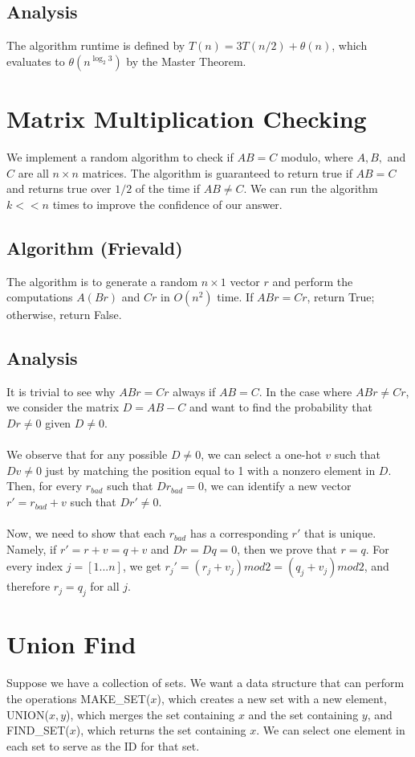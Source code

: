 \documentclass{article}
\begin{document}
\subsection*{Analysis}
The algorithm runtime is defined by $T(n) = 3 T(n/2) + \theta (n)$, which evaluates to $\theta(n^{\log_2 3})$ by the Master Theorem.
\section*{Matrix Multiplication Checking}
We implement a random algorithm to check if $AB = C$ modulo, where $A, B,$ and $C$ are all $n \times n$ matrices. The algorithm is guaranteed to return true if $AB = C$ and returns true over $1/2$ of the time if $AB \neq C$. We can run the algorithm $k << n$ times to improve the confidence of our answer.
\subsection*{Algorithm (Frievald)}
The algorithm is to generate a random $n \times 1$ vector $r$ and perform the computations $A(Br)$ and $Cr$ in $O(n^2)$ time. If $ABr = Cr$, return True; otherwise, return False.
\subsection*{Analysis}
It is trivial to see why $ABr = Cr$ always if $AB = C$. In the case where $ABr \neq Cr$, we consider the matrix $D = AB - C$ and want to find the probability that $Dr \neq 0$ given $D \neq 0$.\\
\\
We observe that for any possible $D \neq 0$, we can select a one-hot $v$ such that $Dv \neq 0$ just by matching the position equal to 1 with a nonzero element in $D$. Then, for every $r_{bad}$ such that $D r_{bad} = 0$, we can identify a new vector $r' = r_{bad} + v$ such that $D r' \neq 0$.\\
\\
Now, we need to show that each $r_{bad}$ has a corresponding $r'$ that is unique. Namely, if $r' = r + v = q + v$ and $Dr = Dq = 0$, then we prove that $r = q$. For every index $j = [1...n]$, we get $r_j' = (r_j + v_j) mod 2 = (q_j + v_j) mod 2$, and therefore $r_j = q_j$ for all $j$.
\newpage
\section*{Union Find}
Suppose we have a collection of sets. We want a data structure that can perform the operations MAKE\_SET($x$), which creates a new set with a new element, UNION($x, y$), which merges the set containing $x$ and the set containing $y$, and FIND\_SET($x$), which returns the set containing $x$. We can select one element in each set to serve as the ID for that set.
\end{document}
